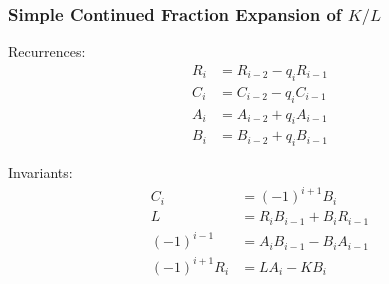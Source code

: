 \documentclass{beamer}
\begin{document}
\begin{frame}
\frametitle{Simple Continued Fraction Expansion of $K / L$}
Recurrences:
\begin{align*}
R_i &= R_{i-2} - q_i R_{i-1} \\
C_i &= C_{i-2} - q_i C_{i-1} \\
A_i &= A_{i-2} + q_i A_{i-1} \\
B_i &= B_{i-2} + q_i B_{i-1}
\end{align*}

Invariants:
\begin{align*}
C_i &= (-1)^{i+1} B_i \\
L &= R_iB_{i-1} + B_iR_{i-1} \\
(-1)^{i-1} &= A_iB_{i-1} - B_iA_{i-1} \\
(-1)^{i+1} R_i &= LA_i - KB_i \\
\end{align*}
\end{frame}
\end{document}
